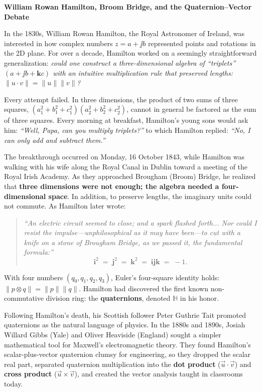 \begin{historybox}
\textbf{William Rowan Hamilton, Broom Bridge, and the Quaternion--Vector Debate}

In the 1830s, William Rowan Hamilton, the Royal Astronomer of Ireland, was interested in how complex numbers $z = a + \jj b$ represented points and rotations in the 2D plane. For over a decade, Hamilton worked on a seemingly straightforward generalization: \emph{could one construct a three-dimensional algebra of ``triplets'' $(a + \jj b + \mathbf{k} c)$ with an intuitive multiplication rule that preserved lengths: $\|u \cdot v\| = \|u\| \|v\|$?}

Every attempt failed. In three dimensions, the product of two sums of three squares, $(a_1^2 + b_1^2 + c_1^2)(a_2^2 + b_2^2 + c_2^2)$, cannot in general be factored as the sum of three squares. Every morning at breakfast, Hamilton's young sons would ask him: \emph{``Well, Papa, can you multiply triplets?''} to which Hamilton replied: \emph{``No, I can only add and subtract them.''}

The breakthrough occurred on Monday, 16 October 1843, while Hamilton was walking with his wife along the Royal Canal in Dublin toward a meeting of the Royal Irish Academy. As they approached Brougham (Broom) Bridge, he realized that \textbf{three dimensions were not enough; the algebra needed a four-dimensional space}. In addition, to preserve lengths, the imaginary units could not commute. As Hamilton later wrote:
\begin{quote}
\emph{``An electric circuit seemed to close; and a spark flashed forth... Nor could I resist the impulse---unphilosophical as it may have been---to cut with a knife on a stone of Brougham Bridge, as we passed it, the fundamental formula:''}
\[
  \mathbf{i}^2 \;=\; \mathbf{j}^2 \;=\; \mathbf{k}^2 \;=\; \mathbf{i}\mathbf{j}\mathbf{k} \;=\; -1.
\]
\end{quote}
With four numbers $(q_0, q_1, q_2, q_3)$, Euler's four-square identity holds: $\|p \otimes q\| = \|p\| \|q\|$. Hamilton had discovered the first known non-commutative division ring: the \textbf{quaternions}, denoted $\mathbb{H}$ in his honor.

Following Hamilton's death, his Scottish follower Peter Guthrie Tait promoted quaternions as the natural language of physics. In the 1880s and 1890s, Josiah Willard Gibbs (Yale) and Oliver Heaviside (England) sought a simpler mathematical tool for Maxwell's electromagnetic theory. They found Hamilton's scalar-plus-vector quaternion clumsy for engineering, so they dropped the scalar real part, separated quaternion multiplication into the \textbf{dot product} ($\vec{u}\cdot\vec{v}$) and \textbf{cross product} ($\vec{u}\times\vec{v}$), and created the vector analysis taught in classrooms today.


\end{historybox}

